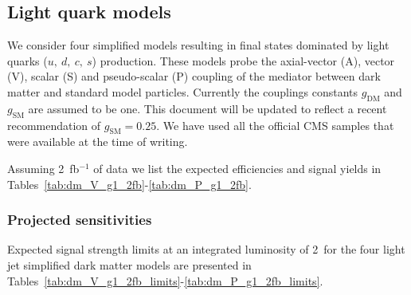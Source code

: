 \subsection{Light quark models} \label{sec:dm_lightjet}

We consider four simplified models resulting in final states dominated by light
quarks ($u,~d,~c,~s$) production. These models probe the axial-vector (A),
vector (V), scalar (S) and pseudo-scalar (P) coupling of the mediator between
dark matter and standard model particles. Currently the couplings constants
$g_\textrm{DM}$ and $g_\textrm{SM}$ are assumed to be one. This document will be
updated to reflect a recent recommendation of $g_\textrm{SM}=0.25$. We have used
all the official CMS samples that were available at the time of writing.

Assuming 2~fb$^{-1}$ of data we list the expected efficiencies and signal yields
in Tables~\ref{tab:dm_V_g1_2fb}-\ref{tab:dm_P_g1_2fb}. 

\newpage  \newpage
 \newpage
 \newpage
 \newpage


\subsubsection{Projected sensitivities}

Expected signal strength limits at an integrated luminosity of 2~\ifb for the
four light jet simplified dark matter models are presented in
Tables~\ref{tab:dm_V_g1_2fb_limits}-\ref{tab:dm_P_g1_2fb_limits}.


 \newpage









